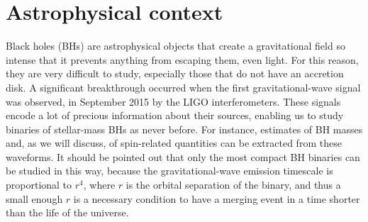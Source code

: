 \section{Astrophysical context} \label{astrophysical_context}
Black holes (BHs) are astrophysical objects that create a gravitational field so intense that it prevents anything from escaping them, even light. For this reason, they are very difficult to study, especially those that do not have an accretion disk. A significant breakthrough occurred when the first gravitational-wave signal was observed, in September 2015 by the LIGO interferometers. These signals encode a lot of precious information about their sources, enabling us to study binaries of stellar-mass BHs as never before. For instance, estimates of BH masses and, as we will discuss, of spin-related quantities can be extracted from these waveforms. It should be pointed out that only the most compact BH binaries can be studied in this way, because the gravitational-wave emission timescale is proportional to $r^4$, where $r$ is the orbital separation of the binary, and thus a small enough $r$ is a necessary condition to have a merging event in a time shorter than the life of the universe.

\vspace{4mm}  


